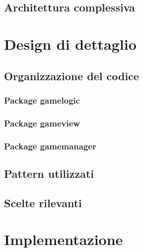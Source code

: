        \section[Architettura]{Architettura complessiva}\label{sec:architecture}
        

    \clearpage

    \chapter{Design di dettaglio}\label{ch:details}
        
        \section{Organizzazione del codice}\label{sec:organization}
            
            \subsection{Package gamelogic}\label{subsec:organization:gamelogic}
                
            \subsection{Package gameview}\label{subsec:organization:gameview}
                
            \subsection{Package gamemanager}\label{subsec:organization:gamemanager}
                
        \section{Pattern utilizzati}\label{sec:pattern}
            
        \section{Scelte rilevanti}\label{sec:choices}
            
           
    \clearpage

    \chapter{Implementazione}\label{ch:implementation}
        
